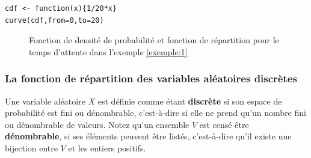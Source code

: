 \begin{example}
\begin{verbatim}
cdf <- function(x){1/20*x}
curve(cdf,from=0,to=20)
\end{verbatim}


\begin{figure}%
\centering
{}%
\qquad
{}%
\caption{Fonction de densité de probabilité et fonction de répartition pour le temps d'attente dans l'exemple \ref{exemple:1}}%
\label{fig:exemple1}%
\end{figure}
\end{example}
\subsubsection{La fonction de répartition des variables aléatoires discrètes}

\theoremstyle{definition}
\begin{definition}
Une variable aléatoire $X$ est définie comme étant \textbf{discrète} si son espace de probabilité est fini ou dénombrable,
c'est-à-dire si elle ne prend qu'un nombre fini ou dénombrable de valeurs. Notez qu'un ensemble $V$ est censé
être \textbf{dénombrable}, si ses éléments peuvent être listés, c'est-à-dire qu'il existe une bijection entre $V$
et les entiers positifs.
\end{definition}

